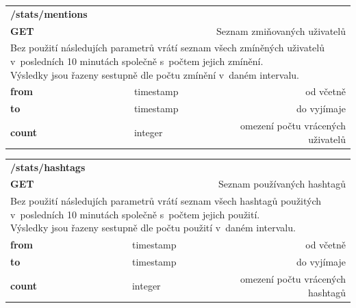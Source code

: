 \documentclass[thesis=B,czech]{FITthesis}[2012/06/26]
\begin{document}
\begin{table}[h]
\begin{tabular}{llllr}
\rowcolor[HTML]{EFEFEF}
\large \textbf{/stats/mentions}        &         &                 &        & \multicolumn{1}{l}{}                \\
\rowcolor[HTML]{EFEFEF}
\textbf{GET}          &         &                 &        & Seznam zmiňovaných uživatelů                        \\
\multicolumn{5}{l}{\parbox[t]{12.8cm}{Bez použití následujích parametrů vrátí seznam všech zmíněných uživatelů v~posledních 10 minutách společně s~počtem jejich zmínění. \\ Výsledky jsou řazeny sestupně dle počtu zmínění v~daném intervalu. }  } \\
\textbf{from}         &         & timestamp       &        & od včetně                           \\
\textbf{to}           &         & timestamp       &        & do vyjímaje                         \\
\textbf{count}        &         & integer         &        & omezení počtu vrácených uživatelů     \\ 
\end{tabular}
\end{table}


\begin{table}[h]
\begin{tabular}{llllr}
\rowcolor[HTML]{EFEFEF}
\large \textbf{/stats/hashtags}        &         &                 &        & \multicolumn{1}{l}{}                \\
\rowcolor[HTML]{EFEFEF}
\textbf{GET}          &         &                 &        & Seznam používaných hashtagů                        \\
\multicolumn{5}{l}{\parbox[t]{12.8cm}{Bez použití následujích parametrů vrátí seznam všech hashtagů použitých v~posledních 10 minutách společně s~počtem jejich použití. \\ Výsledky jsou řazeny sestupně dle počtu použití v~daném intervalu. }  } \\
\textbf{from}         &         & timestamp       &        & od včetně                           \\
\textbf{to}           &         & timestamp       &        & do vyjímaje                         \\
\textbf{count}        &         & integer         &        & omezení počtu vrácených hashtagů     \\
\end{tabular}
\end{table}
\end{document}
